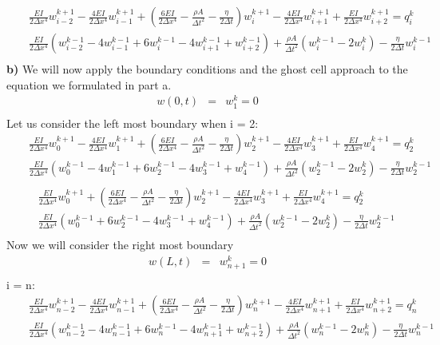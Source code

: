 \documentclass[a4paper]{article}
\begin{document}
\begin{eqnarray*}
& & \frac{EI}{2\Delta x^{4}}w^{k+1}_{i-2} - \frac{4EI}{2\Delta x^{4}}w^{k+1}_{i-1} + (\frac{6EI}{2\Delta x^{4}} - \frac{\rho A}{\Delta t^{2}} - \frac{\eta}{2\Delta t})w^{k+1}_{i}-\frac{4EI}{2\Delta x^{4}}w^{k+1}_{i+1}+\frac{EI}{2\Delta x^{4}}w^{k+1}_{i+2} = q^{k}_{i}\\
& & \frac{EI}{2\Delta x^{4}}(w^{k-1}_{i-2} - 4 w^{k-1}_{i-1} + 6 w^{k-1}_{i} - 4 w^{k-1}_{i+1} +  w^{k-1}_{i+2}) + \frac{\rho A}{\Delta t^{2}}(w^{k-1}_{i}-2w^{k}_{i}) - \frac{\eta}{2\Delta t}w^{k-1}_{i} \\
\end{eqnarray*}
\textbf{b)}
We will now apply the boundary conditions and the ghost cell approach to the equation we formulated in part a. \\
\begin{eqnarray*}
w(0,t) & = & w^{k}_{1}= 0\\
\end{eqnarray*}
Let us consider the left most boundary when i = 2:
\begin{eqnarray*}
& & \frac{EI}{2\Delta x^{4}}w^{k+1}_{0} - \frac{4EI}{2\Delta x^{4}}w^{k+1}_{1} + (\frac{6EI}{2\Delta x^{4}} - \frac{\rho A}{\Delta t^{2}} - \frac{\eta}{2\Delta t})w^{k+1}_{2}-\frac{4EI}{2\Delta x^{4}}w^{k+1}_{3}+\frac{EI}{2\Delta x^{4}}w^{k+1}_{4} = q^{k}_{2}\\
& & \frac{EI}{2\Delta x^{4}}(w^{k-1}_{0} - 4 w^{k-1}_{1} + 6 w^{k-1}_{2} - 4 w^{k-1}_{3} +  w^{k-1}_{4}) + \frac{\rho A}{\Delta t^{2}}(w^{k-1}_{2}-2w^{k}_{2}) - \frac{\eta}{2\Delta t}w^{k-1}_{2} \\
\end{eqnarray*}
\begin{eqnarray*}
& & \frac{EI}{2\Delta x^{4}}w^{k+1}_{0} + (\frac{6EI}{2\Delta x^{4}} - \frac{\rho A}{\Delta t^{2}} - \frac{\eta}{2\Delta t})w^{k+1}_{2}-\frac{4EI}{2\Delta x^{4}}w^{k+1}_{3}+\frac{EI}{2\Delta x^{4}}w^{k+1}_{4} = q^{k}_{2}\\
& & \frac{EI}{2\Delta x^{4}}(w^{k-1}_{0} + 6 w^{k-1}_{2} - 4 w^{k-1}_{3} +  w^{k-1}_{4}) + \frac{\rho A}{\Delta t^{2}}(w^{k-1}_{2}-2w^{k}_{2}) - \frac{\eta}{2\Delta t}w^{k-1}_{2} \\
\end{eqnarray*}
Now we will consider the right most boundary
\begin{eqnarray*}
w(L,t) & = & w^{k}_{n+1}= 0\\
\end{eqnarray*}
i = n:
\begin{eqnarray*}
& & \frac{EI}{2\Delta x^{4}}w^{k+1}_{n-2} - \frac{4EI}{2\Delta x^{4}}w^{k+1}_{n-1} + (\frac{6EI}{2\Delta x^{4}} - \frac{\rho A}{\Delta t^{2}} - \frac{\eta}{2\Delta t})w^{k+1}_{n}-\frac{4EI}{2\Delta x^{4}}w^{k+1}_{n+1}+\frac{EI}{2\Delta x^{4}}w^{k+1}_{n+2} = q^{k}_{n}\\
& & \frac{EI}{2\Delta x^{4}}(w^{k-1}_{n-2} - 4 w^{k-1}_{n-1} + 6 w^{k-1}_{n} - 4 w^{k-1}_{n+1} +  w^{k-1}_{n+2}) + \frac{\rho A}{\Delta t^{2}}(w^{k-1}_{n}-2w^{k}_{n}) - \frac{\eta}{2\Delta t}w^{k-1}_{n} \\
\end{eqnarray*}
\end{document}
